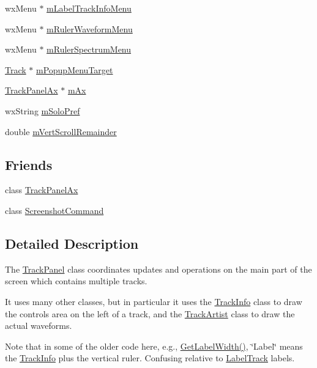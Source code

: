 \begin{DoxyCompactItemize}
\item 
wx\+Menu $\ast$ \hyperlink{class_track_panel_a7f2c4b61e416d1cbfcddeee6d96a2da1}{m\+Label\+Track\+Info\+Menu}
\item 
wx\+Menu $\ast$ \hyperlink{class_track_panel_a5e797a078579ae83a2953dc3cdd4e267}{m\+Ruler\+Waveform\+Menu}
\item 
wx\+Menu $\ast$ \hyperlink{class_track_panel_aaae33e2c9a2354384a4d70672d404074}{m\+Ruler\+Spectrum\+Menu}
\item 
\hyperlink{class_track}{Track} $\ast$ \hyperlink{class_track_panel_a3a96552d3188cea6a3b14cee137a946c}{m\+Popup\+Menu\+Target}
\item 
\hyperlink{class_track_panel_ax}{Track\+Panel\+Ax} $\ast$ \hyperlink{class_track_panel_abc21f88241e49568ad393f60b8dd75b2}{m\+Ax}
\item 
wx\+String \hyperlink{class_track_panel_ad89b7920398dbf82965379e2d0ba0013}{m\+Solo\+Pref}
\item 
double \hyperlink{class_track_panel_aeac4bbf8f576eeb867f67b0cad4b4168}{m\+Vert\+Scroll\+Remainder}
\end{DoxyCompactItemize}
\subsection*{Friends}
\begin{DoxyCompactItemize}
\item 
class \hyperlink{class_track_panel_af348cec23cce5263e8a0acd36e7d594e}{Track\+Panel\+Ax}
\item 
class \hyperlink{class_track_panel_a760b79a183ea3e3e0a058eb7c0fa3564}{Screenshot\+Command}
\end{DoxyCompactItemize}


\subsection{Detailed Description}
The \hyperlink{class_track_panel}{Track\+Panel} class coordinates updates and operations on the main part of the screen which contains multiple tracks. 

It uses many other classes, but in particular it uses the \hyperlink{class_track_info}{Track\+Info} class to draw the controls area on the left of a track, and the \hyperlink{class_track_artist}{Track\+Artist} class to draw the actual waveforms.

Note that in some of the older code here, e.\+g., \hyperlink{class_track_panel_a484e5dfb5256787bbaf7296b0873a167}{Get\+Label\+Width()}, \char`\"{}\+Label\char`\"{} means the \hyperlink{class_track_info}{Track\+Info} plus the vertical ruler. Confusing relative to \hyperlink{class_label_track}{Label\+Track} labels.

